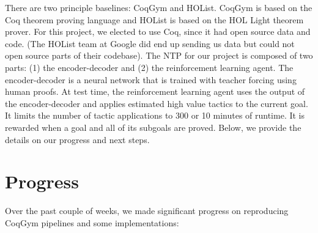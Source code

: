 \documentclass{article}
\begin{document}
There are two principle baselines: CoqGym and HOList. CoqGym is based on the Coq theorem proving language and HOList is based on the HOL Light theorem prover. For this project, we elected to use Coq, since it had open source data and code. (The HOList team at Google did end up sending us data but could not open source parts of their codebase). The NTP for our project is composed of two parts: (1) the encoder-decoder and (2) the reinforcement learning agent. The encoder-decoder is a neural network that is trained with teacher forcing using human proofs. At test time, the reinforcement learning agent uses the output of the encoder-decoder and applies estimated high value tactics to the current goal. It limits the number of tactic applications to 300 or 10 minutes of runtime. It is rewarded when a goal and all of its subgoals are proved. Below, we provide the details on our progress and next steps.

\section{Progress}

Over the past couple of weeks, we made significant progress on reproducing CoqGym pipelines and some implementations: 
\end{document}
